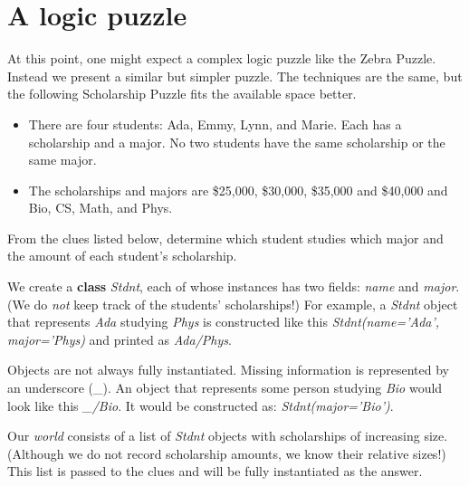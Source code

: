 \section{A logic puzzle}\label{sec:logic-puzzle}

At this point, one might expect a complex logic puzzle like the Zebra Puzzle\cite{ZebraPuzzle}. Instead we present a similar but simpler puzzle. The techniques are the same, but the following Scholarship Puzzle\cite{ScholarshipPuzzle} fits the available space better. 


\begin{itemize}
    \item There are four students: Ada, Emmy, Lynn, and Marie. Each has a scholarship and a major.  No two students have the same scholarship or the same major. 
    \item The scholarships and majors are \$25,000, \$30,000, \$35,000 and \$40,000 and Bio, CS, Math, and Phys. 
\end{itemize}

From the clues listed below, determine which student studies which major and the amount of each student's scholarship.

We create a \textbf{class} \textit{Stdnt}, each of whose instances has two fields: \textit{name} and \textit{major}. (We do \textit{not} keep track of the students' scholarships!) For example, a \textit{Stdnt} object that represents \textit{Ada} studying \textit{Phys} is constructed like this \textit{Stdnt(name='Ada', major='Phys)} and printed as \textit{Ada/Phys}. 

Objects are not always fully instantiated. Missing information is represented by an underscore (\_). An object that represents some person studying \textit{Bio} would look like this \textit{\_/Bio}. It would be constructed as: \textit{Stdnt(major='Bio')}.

Our \textit{world} consists of a list of \textit{Stdnt} objects with scholarships of increasing size. (Although we do not record scholarship amounts, we know their relative sizes!) This list is passed to the clues and will be fully instantiated as the answer.

